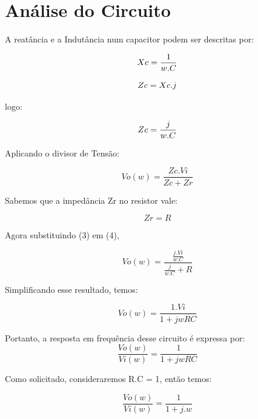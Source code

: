 \documentclass[12pt]{article}
\begin{document}

 
 \section{Análise do Circuito}
A reatância e a Indutância num capacitor podem ser descritas por:

\begin{equation}
Xc = \frac{1}{w.C}\\
\end{equation}

\begin{equation}
Zc = Xc.j\\
\end{equation}

logo:

\begin{equation}
Zc = \frac{j}{w.C}\\
\end{equation}

Aplicando o divisor de Tensão:

\begin{equation}
Vo(w)=\frac{Zc.Vi}{Zc+Zr}
\end{equation}

Sabemos que a impedância Zr no resistor vale:

\begin{equation}
Zr= R
\end{equation}


Agora substituindo (3) em (4), 

\begin{equation}
Vo(w)=\frac{\frac{j.Vi}{w.C}}{\frac{j}{w.C} + R}
\end{equation}

Simplificando esse resultado, temos: 

\begin{equation}
Vo(w)=\frac{1.Vi}{1+jwRC}
\end{equation}

Portanto, a resposta em frequência desse circuito é expressa por:
\begin{equation}
\frac{Vo(w)}{Vi(w)}=\frac{1}{1+jwRC}
\end{equation}

Como solicitado, consideraremos R.C = 1, então temos:

\begin{equation}
\frac{Vo(w)}{Vi(w)}=\frac{1}{1+j.w}
\end{equation}
\end{document}
